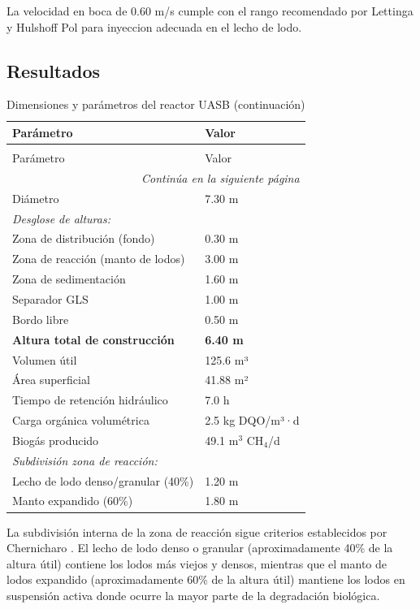 La velocidad en boca de 0.60 m/s cumple con el rango recomendado por Lettinga y Hulshoff Pol para inyeccion adecuada en el lecho de lodo.

\subsection{Resultados}

\begingroup
\small
\begin{longtable}{ll}
\caption{Dimensiones y parámetros del reactor UASB}\\
\toprule
Parámetro & Valor \\
\midrule
\endfirsthead
\caption[]{Dimensiones y parámetros del reactor UASB (continuación)}\\
\toprule
Parámetro & Valor \\
\midrule
\endhead
\midrule
\multicolumn{2}{r}{\textit{Continúa en la siguiente página}} \\
\endfoot
\bottomrule
\endlastfoot
Diámetro & 7.30 m \\
\multicolumn{2}{l}{\textit{Desglose de alturas:}} \\
\quad Zona de distribución (fondo) & 0.30 m \\
\quad Zona de reacción (manto de lodos) & 3.00 m \\
\quad Zona de sedimentación & 1.60 m \\
\quad Separador GLS & 1.00 m \\
\quad Bordo libre & 0.50 m \\
\midrule
\textbf{Altura total de construcción} & \textbf{6.40 m} \\
\midrule
Volumen útil & 125.6 m³ \\
Área superficial & 41.88 m² \\
Tiempo de retención hidráulico & 7.0 h \\
Carga orgánica volumétrica & 2.5 kg DQO/m³·d \\
Biogás producido & 49.1 m$^3$ CH$_4$/d \\
\midrule
\multicolumn{2}{l}{\textit{Subdivisión zona de reacción:}} \\
\quad Lecho de lodo denso/granular (40\%) & 1.20 m \\
\quad Manto expandido (60\%) & 1.80 m \\
\end{longtable}
\endgroup

La subdivisión interna de la zona de reacción sigue criterios establecidos por Chernicharo \cite{chernicharo2007}. El lecho de lodo denso o granular (aproximadamente 40\% de la altura útil) contiene los lodos más viejos y densos, mientras que el manto de lodos expandido (aproximadamente 60\% de la altura útil) mantiene los lodos en suspensión activa donde ocurre la mayor parte de la degradación biológica.

